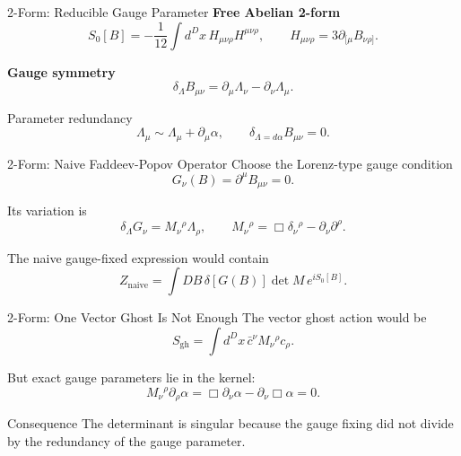 \documentclass[aspectratio=169,professionalfonts]{beamer}
\newcommand{\sidehead}[1]{\textcolor{CourseTeal}{\textbf{#1}}}
\begin{document}
\begin{frame}{2-Form: Reducible Gauge Parameter}
  \sidehead{Free Abelian 2-form}
  \[
    S_0[B]=-\frac{1}{12}\int d^Dx\,H_{\mu\nu\rho}H^{\mu\nu\rho},
    \qquad
    H_{\mu\nu\rho}=3\partial_{[\mu}B_{\nu\rho]} .
  \]

  \sidehead{Gauge symmetry}
  \[
    \delta_\Lambda B_{\mu\nu}
    =\partial_\mu\Lambda_\nu-\partial_\nu\Lambda_\mu .
  \]

  \begin{block}{Parameter redundancy}
    \[
      \Lambda_\mu\sim\Lambda_\mu+\partial_\mu\alpha,
      \qquad
      \delta_{\Lambda=d\alpha}B_{\mu\nu}=0 .
    \]
  \end{block}
\end{frame}

\begin{frame}{2-Form: Naive Faddeev-Popov Operator}
  Choose the Lorenz-type gauge condition
  \[
    G_\nu(B)=\partial^\mu B_{\mu\nu}=0 .
  \]

  Its variation is
  \[
    \delta_\Lambda G_\nu=M_\nu{}^\rho\Lambda_\rho,
    \qquad
    M_\nu{}^\rho=\Box\delta_\nu{}^\rho-\partial_\nu\partial^\rho .
  \]

  The naive gauge-fixed expression would contain
  \[
    Z_{\mathrm{naive}}
    =\int DB\,\delta[G(B)]\det M\,e^{iS_0[B]} .
  \]
\end{frame}

\begin{frame}{2-Form: One Vector Ghost Is Not Enough}
  The vector ghost action would be
  \[
    S_{\mathrm{gh}}
    =\int d^Dx\,\bar c^\nu M_\nu{}^\rho c_\rho .
  \]

  But exact gauge parameters lie in the kernel:
  \[
    M_\nu{}^\rho\partial_\rho\alpha
    =\Box\partial_\nu\alpha-\partial_\nu\Box\alpha=0 .
  \]

  \begin{alertblock}{Consequence}
    The determinant is singular because the gauge fixing did not divide by
    the redundancy of the gauge parameter.
  \end{alertblock}
\end{frame}
\end{document}
